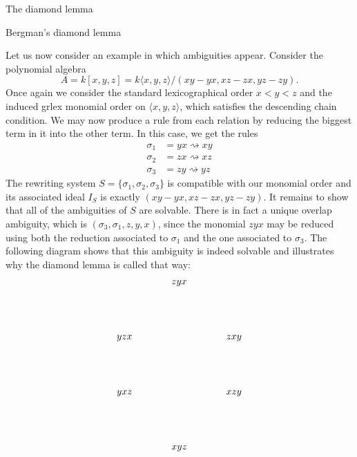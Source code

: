 \begin{chapter}{The diamond lemma}
\begin{section}{Bergman's diamond lemma}
\begin{exmp}
\end{exmp}
\begin{exmp} Let us now consider an example in which ambiguities appear. Consider the polynomial algebra \[A=k[x,y,z]=k\langle x,y,z\rangle/(xy-yx, xz-zx, yz-zy).\]
Once again we consider the standard lexicographical order $x<y<z$ and the induced grlex monomial order on $\langle x,y,z\rangle$, which satisfies the descending chain condition. We may now produce a rule from each relation by reducing the biggest term in it into the other term. In this case, we get the rules
\begin{align*}
\sigma_1 &= yx \rightsquigarrow xy\\
\sigma_2 &= zx \rightsquigarrow xz\\
\sigma_3 &= zy \rightsquigarrow yz
\end{align*}
The rewriting system $S=\{\sigma_1, \sigma_2, \sigma_3\}$ is compatible with our monomial order and its associated ideal $I_S$ is exactly $(xy-yx, xz-zx, yz-zy)$. It remains to show that all of the ambiguities of $S$ are solvable. There is in fact a unique overlap ambiguity, which is $(\sigma_3, \sigma_1, z, y, x)$, since the monomial $zyx$ may be reduced using both the reduction associated to $\sigma_1$ and the one associated to $\sigma_3$. The following diagram shows that this ambiguity is indeed solvable and illustrates why the diamond lemma is called that way:
\[
\begin{tikzpicture}
\node (1) at (0,0) {$zyx$};
\node (a1) at (-2,-2) {$yzx$};
\node (a2) at (2,-2) {$zxy$};
\node (b1) at (-2,-4) {$yxz$};
\node (b2) at (2,-4) {$xzy$};
\node (c) at (0,-6) {$xyz$};


\end{tikzpicture}\]
\end{exmp}
\end{section}
\end{chapter}
